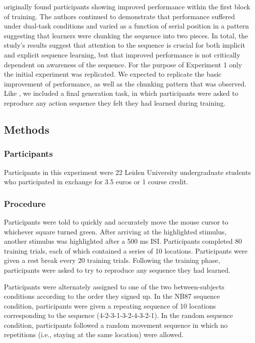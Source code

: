 \documentclass[man,floatsintext]{apa6}
\begin{document}
 originally found participants showing improved performance within the first block of training. The authors continued to demonstrate that performance suffered under dual-task conditions and varied as a function of serial position in a pattern suggesting that learners were chunking the sequence into two pieces. In total, the study's results suggest that attention to the sequence is crucial for both implicit and explicit sequence learning, but that improved performance is not critically dependent on awareness of the sequence. For the purpose of Experiment 1 only the initial experiment was replicated. We expected to replicate the basic improvement of performance, as well as the chunking pattern that was observed. Like , we included a final generation task, in which participants were asked to reproduce any action sequence they felt they had learned during training.

\subsection{Methods}

\subsubsection{Participants}

Participants in this experiment were 22 Leiden University undergraduate students who participated in exchange for 3.5 euros or 1 course credit.

\subsubsection{Procedure}

Participants were told to quickly and accurately move the mouse cursor to whichever square turned green. After arriving at the highlighted stimulus, another stimulus was highlighted after a 500 ms ISI. Participants completed 80 training trials, each of which contained a series of 10 locations. Participants were given a rest break every 20 training trials. Following the training phase, participants were asked to try to reproduce any sequence they had learned.

Participants were alternately assigned to one of the two between-subjects conditions according to the order they signed up. In the NB87 sequence condition, participants were given a repeating sequence of 10 locations corresponding to the  sequence (4-2-3-1-3-2-4-3-2-1). In the random sequence condition, participants followed a random movement sequence in which no repetitions (i.e., staying at the same location) were allowed. 
\end{document}
